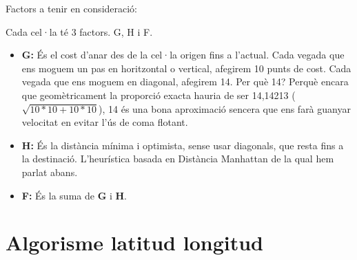 \documentclass[12pt]{article}
\begin{document}
Factors a tenir en consideració:

Cada cel·la té 3 factors. G, H i F.

\begin{itemize}
	\item \textbf{G:} És el cost d'anar des de la cel·la origen fins a l'actual. Cada vegada que ens moguem un pas en horitzontal o vertical, afegirem 10 punts de cost. Cada vegada que ens moguem en diagonal, afegirem 14. Per què 14? Perquè encara que geomètricament la proporció exacta hauria de ser 14,14213 ($\sqrt{10 * 10 + 10 * 10}$), 14 és una bona aproximació sencera que ens farà guanyar velocitat en evitar l'ús de coma flotant.

	\item \textbf{H:} És la distància mínima i optimista, sense usar diagonals, que resta fins a la destinació. L'heurística basada en Distància Manhattan de la qual hem parlat abans.

	\item \textbf{F:} És la suma de \textbf{G} i \textbf{H}.
\end{itemize}

\clearpage
\section{Algorisme latitud longitud \label{ann:lat_lon}}
\end{document}
